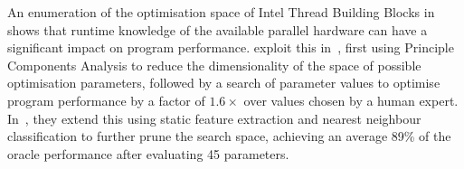\documentclass[nonatbib,preprint,9pt]{sigplanconf}
\begin{document}







An enumeration of the optimisation space of Intel Thread Building
Blocks in~\cite{Contreras2008} shows that runtime knowledge of the
available parallel hardware can have a significant impact on program
performance. \citeauthor{Collins2012} exploit this
in~\cite{Collins2012}, first using Principle Components Analysis to
reduce the dimensionality of the space of possible optimisation
parameters, followed by a search of parameter values to optimise
program performance by a factor of $1.6\times$ over values chosen by a
human expert. In~\cite{Collins2013}, they extend this using static
feature extraction and nearest neighbour classification to further
prune the search space, achieving an average 89\% of the oracle
performance after evaluating 45 parameters.
\end{document}
